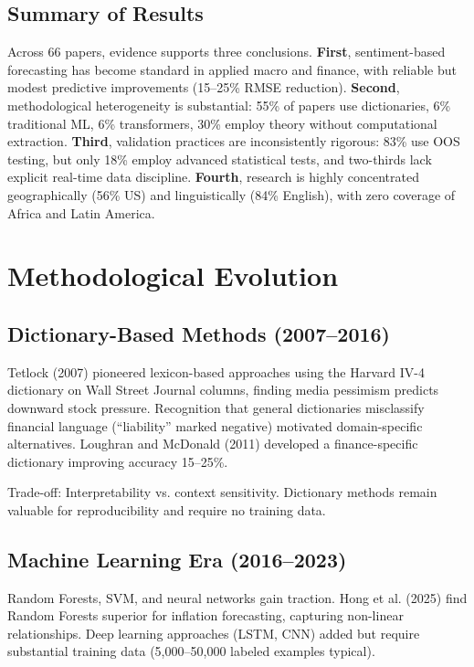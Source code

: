 \documentclass[11pt,twocolumn]{article}
\begin{document}
\subsection{Summary of Results}

Across 66 papers, evidence supports three conclusions. \textbf{First}, sentiment-based forecasting has become standard in applied macro and finance, with reliable but modest predictive improvements (15--25\% RMSE reduction). \textbf{Second}, methodological heterogeneity is substantial: 55\% of papers use dictionaries, 6\% traditional ML, 6\% transformers, 30\% employ theory without computational extraction. \textbf{Third}, validation practices are inconsistently rigorous: 83\% use OOS testing, but only 18\% employ advanced statistical tests, and two-thirds lack explicit real-time data discipline. \textbf{Fourth}, research is highly concentrated geographically (56\% US) and linguistically (84\% English), with zero coverage of Africa and Latin America.

\section{Methodological Evolution}

\subsection{Dictionary-Based Methods (2007--2016)}

Tetlock (2007) pioneered lexicon-based approaches using the Harvard IV-4 dictionary on Wall Street Journal columns, finding media pessimism predicts downward stock pressure. Recognition that general dictionaries misclassify financial language (``liability'' marked negative) motivated domain-specific alternatives. Loughran and McDonald (2011) developed a finance-specific dictionary improving accuracy 15--25\%.

Trade-off: Interpretability vs. context sensitivity. Dictionary methods remain valuable for reproducibility and require no training data.

\subsection{Machine Learning Era (2016--2023)}

Random Forests, SVM, and neural networks gain traction. Hong et al. (2025) find Random Forests superior for inflation forecasting, capturing non-linear relationships. Deep learning approaches (LSTM, CNN) added but require substantial training data (5,000--50,000 labeled examples typical).
\end{document}
